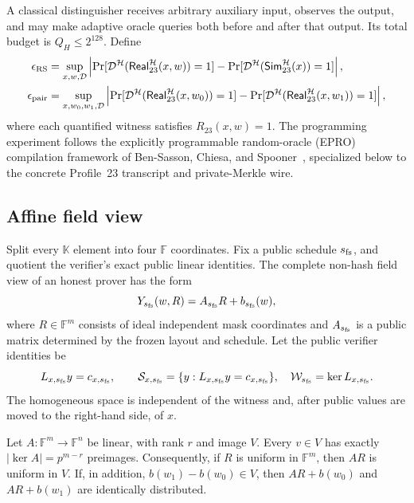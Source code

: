 A classical distinguisher receives arbitrary auxiliary input, observes the
output, and may make adaptive oracle queries both before and after that
output.  Its total budget is \(Q_H\le2^{128}\).  Define
\begin{align*}
 \epsilon_{\rm RS}
   &=\sup_{x,w,\mathcal D}
       \left|\Pr[\mathcal D^{\mathcal H}
          (\mathsf{Real}_{23}^{\mathcal H}(x,w))=1]
       -\Pr[\mathcal D^{\mathcal H}
          (\mathsf{Sim}_{23}^{\mathcal H}(x))=1]\right|,\\
 \epsilon_{\rm pair}
   &=\sup_{x,w_0,w_1,\mathcal D}
       \left|\Pr[\mathcal D^{\mathcal H}
          (\mathsf{Real}_{23}^{\mathcal H}(x,w_0))=1]
       -\Pr[\mathcal D^{\mathcal H}
          (\mathsf{Real}_{23}^{\mathcal H}(x,w_1))=1]\right|,
\end{align*}
where each quantified witness satisfies \(R_{23}(x,w)=1\).
The programming experiment follows the explicitly programmable random-oracle
(EPRO) compilation framework of
Ben-Sasson, Chiesa, and Spooner~\cite{BenSassonChiesaSpooner2016}, specialized
below to the concrete Profile~23 transcript and private-Merkle wire.

\subsection{Affine field view}

Split every \(\mathbb K\) element into four \(\mathbb F\) coordinates.  Fix
a public schedule \(s_{\rm fs}\), and quotient the verifier's exact public
linear identities.  The complete non-hash field view of an honest prover has
the form
\begin{equation}
  Y_{s_{\rm fs}}(w,R)=A_{s_{\rm fs}}R+b_{s_{\rm fs}}(w),
  \label{eq:affine-field-view}
\end{equation}
where \(R\in\mathbb F^m\) consists of ideal independent mask coordinates and
\(A_{s_{\rm fs}}\) is a public matrix determined by the frozen layout and
schedule.  Let the public verifier identities be
\[
 L_{x,s_{\rm fs}}y=c_{x,s_{\rm fs}},\qquad
 \mathcal S_{x,s_{\rm fs}}
   =\{y:L_{x,s_{\rm fs}}y=c_{x,s_{\rm fs}}\},
 \quad
 \mathcal W_{s_{\rm fs}}=\ker L_{x,s_{\rm fs}}.
\]
The homogeneous space is independent of the witness and, after public values
are moved to the right-hand side, of \(x\).

\begin{lemma}
\label{lem:uniform-mask-preimages}
Let \(A:\mathbb F^m\rightarrow\mathbb F^n\) be linear, with rank \(r\) and
image \(V\).  Every \(v\in V\) has exactly
\(
 |\ker A|=p^{m-r}
\)
preimages.  Consequently, if \(R\) is uniform in \(\mathbb F^m\), then
\(AR\) is uniform in \(V\).  If, in addition,
\(b(w_1)-b(w_0)\in V\), then
\(AR+b(w_0)\) and \(AR+b(w_1)\) are identically distributed.
\end{lemma}


